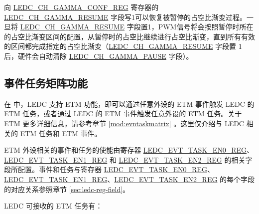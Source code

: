 \documentclass[main\_\_CN.tex]{subfiles}
\begin{document}
向 \hyperref[regdesc:LEDCCHNGAMMACONFREG]{LEDC\_CH\_GAMMA\_CONF\_REG} 寄存器的 \hyperref[fielddesc:LEDCCHNGAMMARESUME]{LEDC\_CH\_GAMMA\_RESUME} 字段写1可以恢复被暂停的占空比渐变过程。一旦将 \hyperref[fielddesc:LEDCCHNGAMMARESUME]{LEDC\_CH\_GAMMA\_RESUME} 字段置1，PWM信号将会按照暂停时所在的占空比渐变区间的配置，从暂停时的占空比继续进行占空比渐变，直到所有有效的区间都完成指定的占空比渐变（\hyperref[fielddesc:LEDCCHNGAMMARESUME]{LEDC\_CH\_GAMMA\_RESUME} 字段置 1 后，硬件会自动清除 \hyperref[fielddesc:LEDCCHNGAMMAPAUSE]{LEDC\_CH\_GAMMA\_PAUSE} 字段）。

\subsection{事件任务矩阵功能}

在 \chipname{} 中，LEDC 支持 ETM 功能，即可以通过任意外设的 ETM 事件触发 LEDC 的 ETM 任务，或者通过 LEDC 的 ETM 事件触发任意外设的 ETM 任务。关于 ETM 更多详细信息，请参考章节 \ref{mod:evntaskmatrix} 。这里仅介绍与 LEDC 相关的 ETM 任务和 ETM 事件。

ETM 外设相关的事件和任务的使能由寄存器 \hyperref[regdesc:LEDCEVTTASKEN0REG]{LEDC\_EVT\_TASK\_EN0\_REG}、\hyperref[regdesc:LEDCEVTTASKEN1REG]{LEDC\_EVT\_TASK\_EN1\_REG} 和 \hyperref[regdesc:LEDCEVTTASKEN2REG]{LEDC\_EVT\_TASK\_EN2\_REG} 的相关字段所配置。事件和任务与寄存器 \hyperref[regdesc:LEDCEVTTASKEN0REG]{LEDC\_EVT\_TASK\_EN0\_REG}、\hyperref[regdesc:LEDCEVTTASKEN1REG]{LEDC\_EVT\_TASK\_EN1\_REG}、\hyperref[regdesc:LEDCEVTTASKEN2REG]{LEDC\_EVT\_TASK\_EN2\_REG} 的每个字段的对应关系参照章节 \ref{sec:ledc-reg-field}。

LEDC 可接收的 ETM 任务有：
\end{document}
